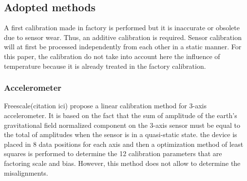 \subsection{Adopted methods}

%


A first calibration made in factory is performed but it is inaccurate or obsolete due to sensor wear. Thus, an additive calibration is required. Sensor calibration will at first be processed independently from each other in a static manner. For this paper, the calibration do not take into account here the influence of temperature because it is already treated in the factory calibration.

\subsubsection{Accelerometer}

%

Freescale(citation ici) propose a linear calibration method for 3-axis accelerometer. It is based on the fact that the sum of amplitude of the earth's gravitational field normalized component  on the 3-axis sensor must be equal to the total of amplitudes when the sensor is in a quasi-static state. the device is placed  in 8 data positions for each axis and then a optimization method of least squares is performed to determine the 12 calibration parameters that are factoring scale and bias. However, this method does not allow to determine the misalignments.


